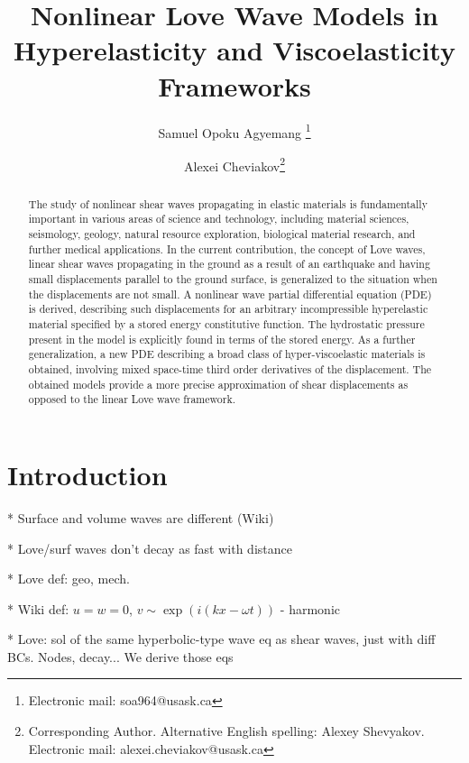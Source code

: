 \documentclass[11pt,letter,subeqn,fleqn]{article}
\title{Nonlinear Love Wave Models in Hyperelasticity and Viscoelasticity Frameworks}
\author[1]{Samuel Opoku Agyemang \thanks{Electronic mail: soa964@usask.ca}}
\author[1]{Alexei Cheviakov\thanks{Corresponding Author. Alternative English spelling: Alexey Shevyakov. Electronic mail: alexei.cheviakov@usask.ca}}
\affil[1]{Department of Mathematics and Statistics, University of Saskatchewan}
\numberwithin{equation}{section}
\numberwithin{table}{section}
\numberwithin{figure}{section}
\begin{document}
\maketitle {}
\maketitle {}


\begin{abstract}

The study of nonlinear shear waves propagating in elastic materials is fundamentally important in various areas of science and technology, including material sciences, seismology, geology, natural resource exploration, biological material research, and further medical applications. In the current contribution, the concept of Love waves, linear shear waves propagating in the ground as a result of an earthquake and having small displacements parallel to the ground surface, is generalized to the situation when the displacements are not small. A nonlinear wave partial differential equation (PDE) is derived, describing such displacements for an arbitrary incompressible hyperelastic material specified by a stored energy constitutive function. The hydrostatic pressure present in the model is explicitly found in terms of the stored energy.
As a further generalization, a new PDE describing a broad class of hyper-viscoelastic materials is obtained, involving mixed space-time third order derivatives of the displacement. The obtained models provide a more precise approximation of shear displacements as opposed to the linear Love wave framework.
\end{abstract}


\section{Introduction}


* Surface and volume waves are different (Wiki)

* Love/surf waves don't decay as fast with distance

* Love def: geo, mech.

* Wiki def: $u=w=0$,  $v\sim \exp(i(kx-\omega t))$ - harmonic

* Love: sol of the same hyperbolic-type wave eq as shear waves, just with diff BCs. Nodes, decay... We derive those eqs
\end{document}
